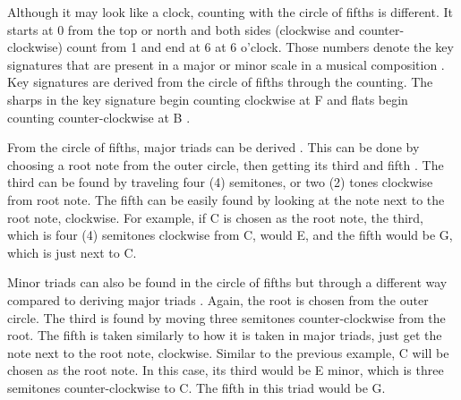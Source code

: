         Although it may look like a clock, counting with the circle of fifths is different. It starts at 0 from the top or north and both sides (clockwise and counter-clockwise) count from 1 and end at 6 at 6 o'clock. Those numbers denote the key signatures that are present in a major or minor scale in a musical composition \citep{jensen1992circle}. Key signatures are derived from the circle of fifths through the counting. The sharps in the key signature begin counting clockwise at F and flats begin counting counter-clockwise at B \citep{clough1986musical}.
        
        
        
        From the circle of fifths, major triads can be derived \citep{jensen1992circle, spencer1996music}. This can be done by choosing a root note from the outer circle, then getting its third and fifth \citep{jensen1992circle}. The third can be found by traveling four (4) semitones, or two (2) tones clockwise from root note. The fifth can be easily found by looking at the note next to the root note, clockwise. For example, if C is chosen as the root note, the third, which is four (4) semitones clockwise from C, would E, and the fifth would be G, which is just next to C.
        
        Minor triads can also be found in the circle of fifths but through a different way compared to deriving major triads \citep{jensen1992circle}. Again, the root is chosen from the outer circle. The third is found by moving three semitones counter-clockwise from the root. The fifth is taken similarly to how it is taken in major triads, just get the note next to the root note, clockwise. Similar to the previous example, C will be chosen as the root note. In this case, its third would be E minor, which is three semitones counter-clockwise to C. The fifth in this triad would be G. 
        
